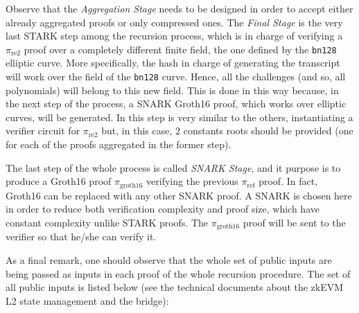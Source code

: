 Observe that the \textit{Aggregation Stage} needs to be designed in order to accept either already aggregated proofs or only compressed ones. 
The \textit{Final Stage} is the very last STARK step among the recursion process, which is in charge of verifying a $\pi_{\text{re2}}$ proof over a completely different finite field, the one defined by the \texttt{bn128} elliptic curve. More specifically, the hash in charge of generating the transcript will work over the field of the \texttt{bn128} curve. Hence, all the challenges (and so, all polynomials) will belong to this new field. This is done in this way because, in the next step of the process, a SNARK Groth16 proof, which works over elliptic curves, will be generated. In this step is very similar to the others, instantiating a verifier circuit for $\pi_{\text{re2}}$ but, in this case, $2$ constants roots should be provided (one for each of the proofs aggregated in the former step). 



The last step of the whole process is called \textit{SNARK Stage}, and it purpose is to produce a Groth16 proof $\pi_{\text{groth16}}$ verifying the previous $\pi_{\text{ref}}$ proof. In fact, Groth16 can be replaced with any other SNARK proof. A SNARK is chosen here in order to reduce both verification complexity and proof size, which have constant complexity unlike STARK proofs. The $\pi_{\text{groth16}}$ proof will be sent to the verifier so that he/she can verify it. 


As a final remark, one should observe that the whole set of public inputs are being passed as inputs in each proof of the whole recursion procedure. The set of all public inputs is listed below (see the technical documents about the zkEVM L2 state management and the bridge):

